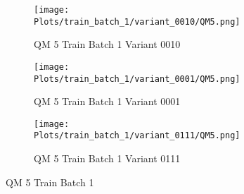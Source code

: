 \documentclass{DissertateFigs}
\begin{document}
\begin{figure}[t!]
\medskip

    \begin{subfigure}{0.47\textwidth}
    \texttt{[image: Plots/train\_batch\_1/variant\_0010/QM5.png]}
    \caption{QM 5 Train Batch 1 Variant 0010}
    \end{subfigure}
    \begin{subfigure}{0.47\textwidth}
    \texttt{[image: Plots/train\_batch\_1/variant\_0001/QM5.png]}
    \caption{QM 5 Train Batch 1 Variant 0001}
    \end{subfigure}

\medskip

    \begin{subfigure}{0.47\textwidth}
    \texttt{[image: Plots/train\_batch\_1/variant\_0111/QM5.png]}
    \caption{QM 5 Train Batch 1 Variant 0111}
    \end{subfigure}
\caption{QM 5 Train Batch 1}
    \end{figure}
\clearpage
\end{document}
